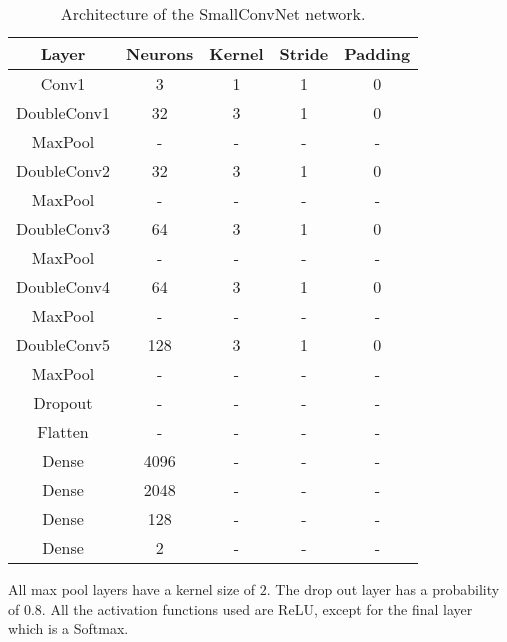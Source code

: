 \begin{table}[H]
    \centering
    \begin{tabular}{|c|c|c|c|c|}
        \hline
        \textbf{Layer} & \textbf{Neurons} & \textbf{Kernel} & \textbf{Stride} & \textbf{Padding} \\ \hline
        \hline
        Conv1 & 3 & 1 & 1 & 0 \\ \hline
        DoubleConv1 & 32 & 3 & 1 & 0 \\ \hline
        MaxPool & - & - & - & - \\ \hline
        DoubleConv2 & 32 & 3 & 1 & 0 \\ \hline
        MaxPool & - & - & - & - \\ \hline
        DoubleConv3 & 64 & 3 & 1 & 0 \\ \hline
        MaxPool & - & - & - & - \\ \hline
        DoubleConv4 & 64 & 3 & 1 & 0 \\ \hline
        MaxPool & - & - & - & - \\ \hline
        DoubleConv5 & 128 & 3 & 1 & 0 \\ \hline
        MaxPool & - & - & - & - \\ \hline
        Dropout & - & - & - & - \\ \hline
        Flatten & - & - & - & - \\ \hline
        Dense & 4096 & - & - & - \\ \hline
        Dense & 2048 & - & - & - \\ \hline
        Dense & 128 & - & - & - \\ \hline
        Dense & 2 & - & - & - \\ \hline
    \end{tabular}
    \caption{Architecture of the SmallConvNet network.}
    \label{tab:B.smallconvnet}
\end{table}

All max pool layers have a kernel size of $2$. The drop out layer has a probability of $\num{0.8}$. All the activation functions used are ReLU, except for the final layer which is a Softmax.
